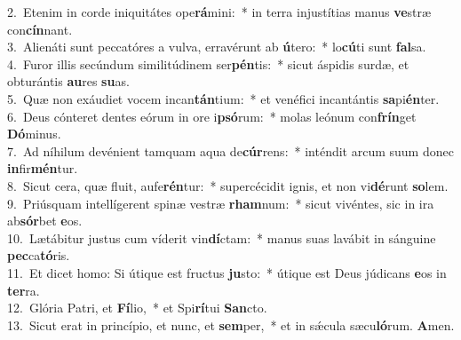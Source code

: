{2.~}Etenim in corde iniquitátes ope\textbf{rá}mini:~* in terra injustítias manus \textbf{ve}stræ con\textbf{cín}nant.\\
{3.~}Alienáti sunt peccatóres a vulva, erravérunt ab \textbf{ú}tero:~* lo\textbf{cú}ti sunt \textbf{fal}sa.\\
{4.~}Furor illis secúndum similitúdinem ser\textbf{pén}tis:~* sicut áspidis surdæ, et obturántis \textbf{au}res \textbf{su}as.\\
{5.~}Quæ non exáudiet vocem incan\textbf{tán}tium:~* et venéfici incantántis \textbf{sa}pi\textbf{én}ter.\\
{6.~}Deus cónteret dentes eórum in ore i\textbf{psó}rum:~* molas leónum con\textbf{frín}get \textbf{Dó}minus.\\
{7.~}Ad níhilum devénient tamquam aqua de\textbf{cúr}rens:~* inténdit arcum suum donec \textbf{in}fir\textbf{mén}tur.\\
{8.~}Sicut cera, quæ fluit, aufe\textbf{rén}tur:~* supercécidit ignis, et non vi\textbf{dé}runt \textbf{so}lem.\\
{9.~}Priúsquam intellígerent spinæ vestræ \textbf{rham}num:~* sicut vivéntes, sic in ira ab\textbf{sór}bet \textbf{e}os.\\
{10.~}Lætábitur justus cum víderit vin\textbf{dí}ctam:~* manus suas lavábit in sánguine \textbf{pec}ca\textbf{tó}ris.\\
{11.~}Et dicet homo: Si útique est fructus \textbf{ju}sto:~* útique est Deus júdicans \textbf{e}os in \textbf{ter}ra.\\
{12.~}Glória Patri, et \textbf{Fí}lio,~* et Spi\textbf{rí}tui \textbf{San}cto.\\
{13.~}Sicut erat in princípio, et nunc, et \textbf{sem}per,~* et in sǽcula sæcu\textbf{ló}rum. \textbf{A}men.\\
